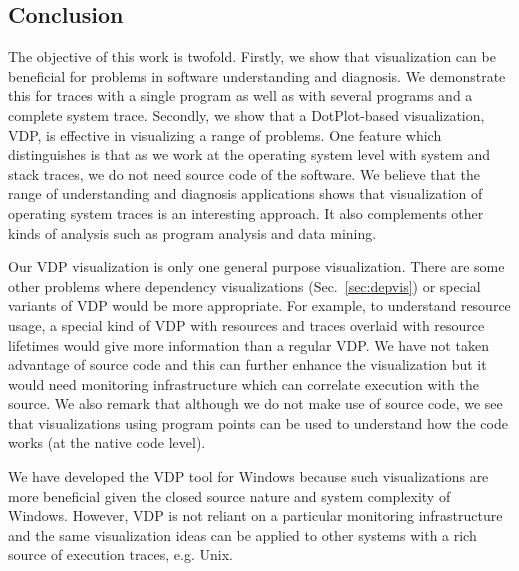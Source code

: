 \subsection{Conclusion}
\label{sec:lviz-conclusion}

The objective of this work is twofold.
Firstly, we show that visualization can be beneficial for problems
in software understanding and diagnosis. We demonstrate this
for traces with a single program as well as with
several programs and a complete system trace.
Secondly, we show that a DotPlot-based visualization, VDP, is effective
in visualizing a range of problems.
One feature which distinguishes  is that as we work
at the operating system level with system and stack traces,
we do not need source code of the software.
We believe that the range of understanding and diagnosis applications
shows that visualization of operating system traces is an interesting approach.
It also complements other kinds of analysis such
as program analysis and data mining.

Our VDP visualization is only one general purpose visualization.
There are some other problems where dependency visualizations
(Sec.~\ref{sec:depvis}) or special
variants of VDP would be more appropriate. For example, to understand
resource usage, a special kind of VDP with resources and traces overlaid
with resource lifetimes would give more information than a regular VDP.
We have not taken advantage of source code and this can further enhance
the visualization but it would need monitoring infrastructure which
can correlate execution with the source.
We also remark that although we do not make use of source code, we
see that visualizations using program points can be used to understand
how the code works (at the native code level).

We have developed the VDP tool for Windows because such visualizations
are more beneficial given the closed source nature and system complexity
of Windows.
However, VDP is not reliant on a particular monitoring
infrastructure and the same visualization ideas can be applied
to other systems with a rich source of execution traces, e.g. Unix.
